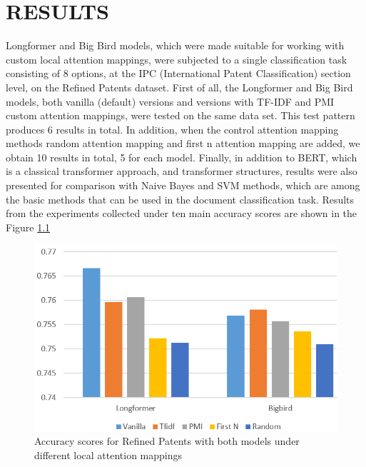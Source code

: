 \documentclass{iyte}
\begin{document}
\chapter{RESULTS}

Longformer and Big Bird models, which were made suitable for working with custom local attention mappings, were subjected to a single classification task consisting of 8 options, at the IPC (International Patent Classification) section level, on the Refined Patents dataset. First of all, the Longformer and Big Bird models, both vanilla (default) versions and versions with TF-IDF and PMI custom attention mappings, were tested on the same data set. This test pattern produces 6 results in total. In addition, when the control attention mapping methods random attention mapping and first n attention mapping are added, we obtain 10 results in total, 5 for each model. Finally, in addition to BERT, which is a classical transformer approach, and transformer structures, results were also presented for comparison with Naive Bayes and SVM methods, which are among the basic methods that can be used in the document classification task. Results from the experiments collected under ten main accuracy scores are shown in the Figure \ref{chart:accuracy_result}

\begin{figure}[ht]
\includegraphics[width=15cm]{images/accuracy.png}
\caption{Accuracy scores for Refined Patents with both models under different local attention mappings}
\label{chart:accuracy_result}
\end{figure}
\end{document}
